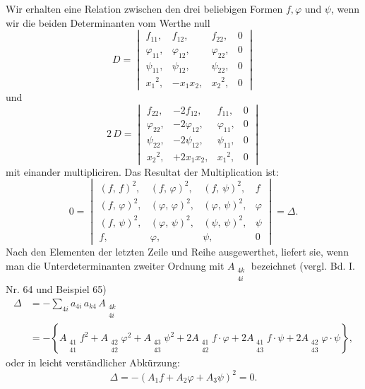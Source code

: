 \documentclass[11pt]{article}
\providecommand{\weq}[2]{\begin{equation}\tag{#1}#2\end{equation}}
\begin{document}
Wir erhalten eine Relation zwischen den drei beliebigen Formen $f, \varphi$ und $\psi$, wenn wir die beiden Determinanten vom Werthe null
\weq{I}{
D = \begin{vmatrix} f_{11}, & f_{12}, & f_{22}, & 0 \\ \varphi_{11}, & \varphi_{12}, & \varphi_{22}, & 0 \\ \psi_{11}, & \psi_{12}, & \psi_{22}, & 0 \\ x_1{}^2, & -x_1x_2, & x_2{}^2, & 0 \end{vmatrix}
}
und
\weq{II}{
2\,D = \begin{vmatrix} f_{22}, & -2f_{12}, & f_{11}, & 0 \\ \varphi_{22}, & -2\varphi_{12}, & \varphi_{11}, & 0 \\ \psi_{22}, & -2\psi_{12}, & \psi_{11}, & 0 \\ x_2{}^2, & +2x_1x_2, & x_1{}^2, & 0 \end{vmatrix}
}
mit einander multipliciren. Das Resultat der Multiplication ist:
\weq{III}{
0 = \begin{vmatrix} (f,\,f)^2, & (f,\,\varphi)^2, & (f,\,\psi)^2, & f \\ (f,\,\varphi)^2, & (\varphi,\,\varphi)^2, & (\varphi,\,\psi)^2, & \varphi \\ (f,\,\psi)^2, & (\varphi,\,\psi)^2, & (\psi,\,\psi)^2, & \psi \\ f, & \varphi, & \psi, & 0 \end{vmatrix} = \varDelta.
}
Nach den Elementen der letzten Zeile und Reihe ausgewerthet, liefert sie, wenn man die Unterdeterminanten zweiter Ordnung mit $A_{\substack{4k\\4i}}$ bezeichnet (vergl. Bd. I. Nr. 64 und Beispiel 65)
\[
\begin{aligned}
\varDelta &= -\sum_{4i} a_{4i}\,a_{k4}\,A_{\substack{4k\\4i}} \\
&= -\left\{A_{\substack{41\\41}}f^2 + A_{\substack{42\\42}}\varphi^2 + A_{\substack{43\\43}}\psi^2 + 2A_{\substack{41\\42}}f\cdot\varphi + 2A_{\substack{41\\43}}f\cdot\psi + 2A_{\substack{42\\43}}\varphi\cdot\psi\right\},
\end{aligned}
\]
oder in leicht verständlicher Abkürzung:
\[
\varDelta = -(A_1f + A_2\varphi + A_3\psi)^2 = 0.
\]
\end{document}

